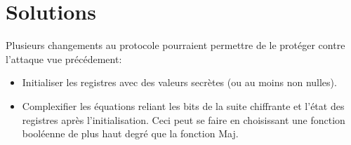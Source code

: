 \section{Solutions}
Plusieurs changements au protocole pourraient permettre de le protéger contre l'attaque vue précédement:
\begin{itemize}
\item{Initialiser les registres avec des valeurs secrètes (ou au moins non nulles).}
\item{Complexifier les équations reliant les bits de la suite chiffrante et l'état des registres après l'initialisation. Ceci peut se faire en choisissant une fonction booléenne de plus haut degré que la fonction Maj.}
\end{itemize}
